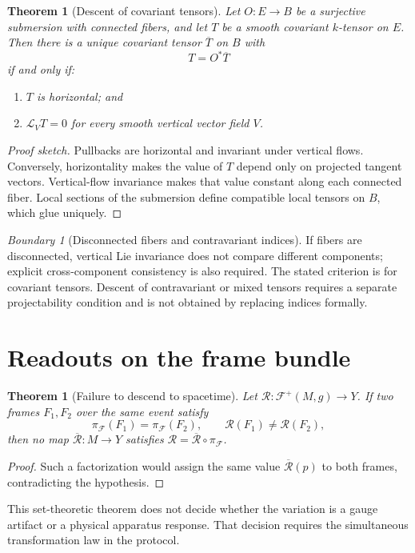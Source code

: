 \documentclass[11pt,a4paper]{article}
\theoremstyle{definition}
\theoremstyle{plain}
\newtheorem{theorem}[definition]{Theorem}
\theoremstyle{remark}
\newtheorem{warning}[definition]{Boundary}
\newcommand{\F}{\mathcal{F}}
\newcommand{\Lie}{\mathcal{L}}
\begin{document}
\begin{theorem}[Descent of covariant tensors]
Let $O:E\to B$ be a surjective submersion with connected fibers, and let
$T$ be a smooth covariant $k$-tensor on $E$. Then there is a unique
covariant tensor $\overline T$ on $B$ with
\[
T=O^*\overline T
\]
if and only if:
\begin{enumerate}[leftmargin=*]
\item $T$ is horizontal; and
\item $\Lie_VT=0$ for every smooth vertical vector field $V$.
\end{enumerate}
\end{theorem}
\begin{proof}[Proof sketch]
Pullbacks are horizontal and invariant under vertical flows. Conversely,
horizontality makes the value of $T$ depend only on projected tangent
vectors. Vertical-flow invariance makes that value constant along each
connected fiber. Local sections of the submersion define compatible local
tensors on $B$, which glue uniquely.
\end{proof}

\begin{warning}[Disconnected fibers and contravariant indices]
If fibers are disconnected, vertical Lie invariance does not compare
different components; explicit cross-component consistency is also
required. The stated criterion is for covariant tensors. Descent of
contravariant or mixed tensors requires a separate projectability
condition and is not obtained by replacing indices formally.
\end{warning}

\section{Readouts on the frame bundle}

\begin{theorem}[Failure to descend to spacetime]
Let $\mathcal R:\F^+(M,g)\to Y$. If two frames $F_1,F_2$ over the same
event satisfy
\[
\pi_{\F}(F_1)=\pi_{\F}(F_2),\qquad
\mathcal R(F_1)\ne\mathcal R(F_2),
\]
then no map $\overline{\mathcal R}:M\to Y$ satisfies
$\mathcal R=\overline{\mathcal R}\circ\pi_{\F}$.
\end{theorem}
\begin{proof}
Such a factorization would assign the same value
$\overline{\mathcal R}(p)$ to both frames, contradicting the hypothesis.
\end{proof}

This set-theoretic theorem does not decide whether the variation is a gauge
artifact or a physical apparatus response. That decision requires the
simultaneous transformation law in the protocol.
\end{document}
